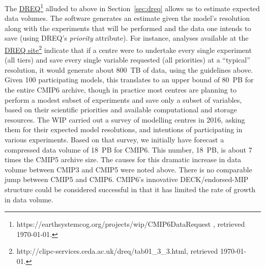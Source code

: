 \documentclass[gmd,manuscript]{copernicus}
\begin{document}
The \href{https://earthsystemcog.org/projects/wip/CMIP6DataRequest
}{DREQ}\footnote{https://earthsystemcog.org/projects/wip/CMIP6DataRequest
  , retrieved \today.} alluded to above in Section~\ref{sec:dreq}
allows us to estimate expected data volumes. The software generates an
estimate given the model's resolution along with the experiments that
will be performed and the data one intends to save (using DREQ's
\emph{priority} attribute).
For instance, analyses available at the
\href{http://clipc-services.ceda.ac.uk/dreq/tab01_3_3.html}{DREQ
  site}\footnote{http://clipc-services.ceda.ac.uk/dreq/tab01\_3\_3.html,
  retrieved \today.} indicate that if a centre were to undertake every
single experiment (all tiers) and save every single variable requested
(all priorities) at a ``typical'' resolution, it would generate about
800~TB of data, using the guidelines above. Given 100 participating
models, this translates to an upper bound of 80~PB for the entire
CMIP6 archive, though in practice most centres are planning to perform
a modest subset of experiments and save only a subset of variables,
based on their scientific priorities and available computational and
storage resources. The WIP carried out a survey of modelling centres
in 2016, asking them for their expected model resolutions, and
intentions of participating in various experiments. Based on that
survey, we initially have forecast a compressed data volume of 18~PB
for CMIP6. This number, 18~PB, is about 7 times the CMIP5 archive
size. The causes for this dramatic increase in data volume between
CMIP3 and CMIP5 were noted above. There is no comparable jump between
CMIP5 and CMIP6. CMIP6's innovative DECK/endorsed-MIP structure could
be considered successful in that it has limited the rate of growth in
data volume.
\end{document}
